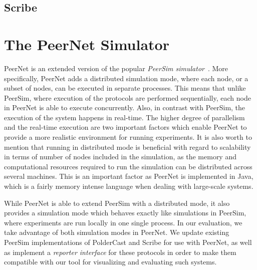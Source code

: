 \subsection{Scribe}

\section{The PeerNet Simulator}
PeerNet is an extended version of the
popular \emph{PeerSim simulator}~\cite{p2p09-peersim}. More
specifically, PeerNet adds a distributed simulation mode, where each
node, or a subset of nodes, can be executed in separate processes. This
means that unlike PeerSim, where execution of the protocols are
performed sequentially, each node in PeerNet is able to execute
concurrently. Also, in contrast with PeerSim, the execution of the
system happens in real-time. The higher degree of parallelism and
the real-time execution are two important factors which enable PeerNet to
provide a more realistic environment for running experiments. It is also
worth to mention that running in distributed mode is beneficial with
regard to scalability in terms of number of nodes included in the
simulation, as the memory and computational resources required to run
the simulation can be distributed across several machines. This is an
important factor as PeerNet is implemented in Java, which is a fairly
memory intense language when dealing with large-scale systems.

While PeerNet is able to extend PeerSim with a distributed mode, it also
provides a simulation mode which behaves exactly like simulations in
PeerSim, where experiments are run locally in one single process. In our
evaluation, we take advantage of both simulation modes in PeerNet. We
update existing PeerSim implementations of PolderCast and Scribe for use
with PeerNet, as well as implement a \emph{reporter interface} for these
protocols in order to make them compatible with our tool for visualizing
and evaluating such systems.
